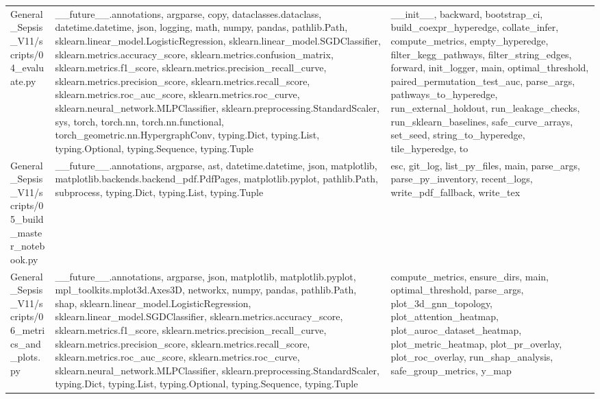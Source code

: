 \documentclass[11pt]{article}
\begin{document}
\begin{longtable}{p{}p{}p{}}
General\_Sepsis\_V11/scripts/04\_evaluate.py & \_\_future\_\_.annotations, argparse, copy, dataclasses.dataclass, datetime.datetime, json, logging, math, numpy, pandas, pathlib.Path, sklearn.linear\_model.LogisticRegression, sklearn.linear\_model.SGDClassifier, sklearn.metrics.accuracy\_score, sklearn.metrics.confusion\_matrix, sklearn.metrics.f1\_score, sklearn.metrics.precision\_recall\_curve, sklearn.metrics.precision\_score, sklearn.metrics.recall\_score, sklearn.metrics.roc\_auc\_score, sklearn.metrics.roc\_curve, sklearn.neural\_network.MLPClassifier, sklearn.preprocessing.StandardScaler, sys, torch, torch.nn, torch.nn.functional, torch\_geometric.nn.HypergraphConv, typing.Dict, typing.List, typing.Optional, typing.Sequence, typing.Tuple & \_\_init\_\_, backward, bootstrap\_ci, build\_coexpr\_hyperedge, collate\_infer, compute\_metrics, empty\_hyperedge, filter\_kegg\_pathways, filter\_string\_edges, forward, init\_logger, main, optimal\_threshold, paired\_permutation\_test\_auc, parse\_args, pathways\_to\_hyperedge, run\_external\_holdout, run\_leakage\_checks, run\_sklearn\_baselines, safe\_curve\_arrays, set\_seed, string\_to\_hyperedge, tile\_hyperedge, to \\
General\_Sepsis\_V11/scripts/05\_build\_master\_notebook.py & \_\_future\_\_.annotations, argparse, ast, datetime.datetime, json, matplotlib, matplotlib.backends.backend\_pdf.PdfPages, matplotlib.pyplot, pathlib.Path, subprocess, typing.Dict, typing.List, typing.Tuple & esc, git\_log, list\_py\_files, main, parse\_args, parse\_py\_inventory, recent\_logs, write\_pdf\_fallback, write\_tex \\
General\_Sepsis\_V11/scripts/06\_metrics\_and\_plots.py & \_\_future\_\_.annotations, argparse, json, matplotlib, matplotlib.pyplot, mpl\_toolkits.mplot3d.Axes3D, networkx, numpy, pandas, pathlib.Path, shap, sklearn.linear\_model.LogisticRegression, sklearn.linear\_model.SGDClassifier, sklearn.metrics.accuracy\_score, sklearn.metrics.f1\_score, sklearn.metrics.precision\_recall\_curve, sklearn.metrics.precision\_score, sklearn.metrics.recall\_score, sklearn.metrics.roc\_auc\_score, sklearn.metrics.roc\_curve, sklearn.neural\_network.MLPClassifier, sklearn.preprocessing.StandardScaler, typing.Dict, typing.List, typing.Optional, typing.Sequence, typing.Tuple & compute\_metrics, ensure\_dirs, main, optimal\_threshold, parse\_args, plot\_3d\_gnn\_topology, plot\_attention\_heatmap, plot\_auroc\_dataset\_heatmap, plot\_metric\_heatmap, plot\_pr\_overlay, plot\_roc\_overlay, run\_shap\_analysis, safe\_group\_metrics, y\_map \\
\end{longtable}
\end{document}
